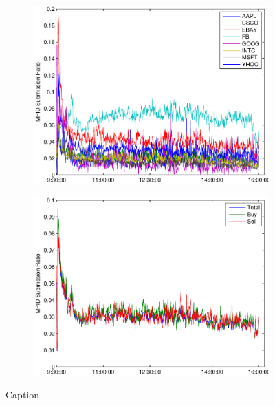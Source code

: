 \documentclass{article}
\begin{document}
\begin{figure}[htp!]
\caption{Average Daily MPID Submission Ratios, by Firm}\label{ratiostats1}
\begin{center}
\begin{subfigure}{0.45\textwidth}
\includegraphics[width=\linewidth]{docs/MPIDSubmission_Daily_ByFirm_30sec_FullTime.pdf}
\end{subfigure}
\begin{subfigure}{0.45\textwidth}
\includegraphics[width=\linewidth]{docs/MPIDSubmission_Daily_ByType_30sec_FullTime.pdf}
\end{subfigure}
\end{center}
\begin{minipage}{\textwidth}
\footnotesize
Caption
\end{minipage}
\end{figure}
\end{document}
